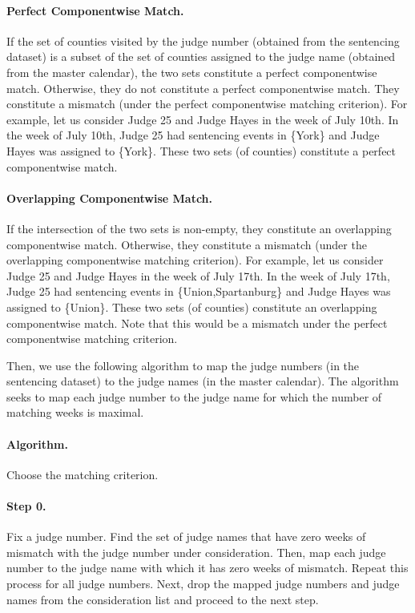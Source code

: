 \documentclass[11pt, oneside]{article}   	%
\theoremstyle{ModifiedStyle}
\begin{document}
  	\paragraph{Perfect Componentwise Match.} If the set of counties visited by the judge number (obtained from the sentencing dataset) is a subset of the set of counties assigned to the judge name (obtained from the master calendar), the two sets constitute a perfect componentwise match. Otherwise, they do not constitute a perfect componentwise match. They constitute a mismatch (under the perfect componentwise matching criterion). For example, let us consider Judge 25 and Judge Hayes in the week of July 10th. In the week of July 10th, Judge 25 had sentencing events in \{York\} and Judge Hayes was assigned to \{York\}. These two sets (of counties) constitute a perfect componentwise match.
  	\vspace{-3mm}
  	\paragraph{Overlapping Componentwise Match.} If the intersection of the two sets is non-empty, they constitute an overlapping componentwise match. Otherwise, they constitute a mismatch (under the overlapping componentwise matching criterion). For example, let us consider Judge 25 and Judge Hayes in the week of July 17th. In the week of July 17th, Judge 25 had sentencing events in \{Union,Spartanburg\} and Judge Hayes was assigned to \{Union\}. These two sets (of counties) constitute an overlapping componentwise match. Note that this would be a mismatch under the perfect componentwise matching criterion.

  	Then, we use the following algorithm to map the judge numbers (in the sentencing dataset) to the judge names (in the master calendar). The algorithm seeks to map each judge number to the judge name for which the number of matching weeks is maximal.
  	\vspace{-3mm}
  	\paragraph{Algorithm.} Choose the matching criterion.
  	\vspace{-5mm}
  	\paragraph{Step 0.} Fix a judge number. Find the set of judge names that have zero weeks of mismatch with the judge number under consideration. Then, map each judge number to the judge name with which it has zero weeks of mismatch. Repeat this process for all judge numbers. Next, drop the mapped judge numbers and judge names from the consideration list and proceed to the next step.
  	\vspace{-5mm}
\end{document}

